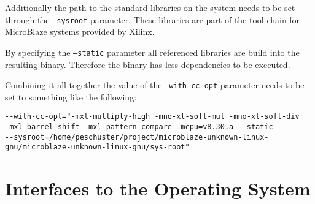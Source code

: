 Additionally the path to the standard libraries on the system needs to be set through the \texttt{--sysroot} parameter. These libraries are part of the tool chain for MicroBlaze systems provided by Xilinx. 

By specifying the \texttt{--static} parameter all referenced libraries are build into the resulting binary. Therefore the binary has less dependencies to be executed.

Combining it all together the value of the \texttt{--with-cc-opt} parameter needs to be set to something like the following: 

\begin{verbatim}
--with-cc-opt="-mxl-multiply-high -mno-xl-soft-mul -mno-xl-soft-div 
-mxl-barrel-shift -mxl-pattern-compare -mcpu=v8.30.a --static 
--sysroot=/home/peschuster/project/microblaze-unknown-linux-gnu/microblaze-unknown-linux-gnu/sys-root"
\end{verbatim}

\section{Interfaces to the Operating System}